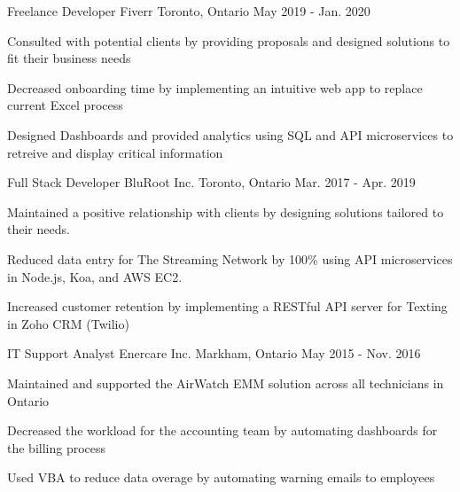 

\begin{cventries}

  \cventry
    {Freelance Developer} %
    {Fiverr} %
    {Toronto, Ontario} %
    {May 2019 - Jan. 2020} %
    {
      \begin{cvitems} %
        \item {Consulted with potential clients by providing proposals and designed solutions to fit their business needs}
        \item {Decreased onboarding time by implementing an intuitive web app to replace current Excel process}
        \item {Designed Dashboards and provided analytics using SQL and API microservices to retreive and display critical information}
      \end{cvitems}
    }
  \cventry
    {Full Stack Developer} %
    {BluRoot Inc.} %
    {Toronto, Ontario} %
    {Mar. 2017 - Apr. 2019} %
    {
      \begin{cvitems} %
        \item {Maintained a positive relationship with clients by designing solutions tailored to their needs.}
        \item {Reduced data entry for The Streaming Network by 100\% using API microservices in Node.js, Koa, and AWS EC2.}
        \item {Increased customer retention by implementing a RESTful API server for Texting in Zoho CRM (Twilio)}
      \end{cvitems}
    }

  \cventry
    {IT Support Analyst} %
    {Enercare Inc.} %
    {Markham, Ontario} %
    {May 2015 - Nov. 2016} %
    {
      \begin{cvitems} %
        \item {Maintained and supported the AirWatch EMM solution across all technicians in Ontario}
        \item {Decreased the workload for the accounting team by automating dashboards for the billing process}
        \item {Used VBA to reduce data overage by automating warning emails to employees}
      \end{cvitems}
    }
\end{cventries}
